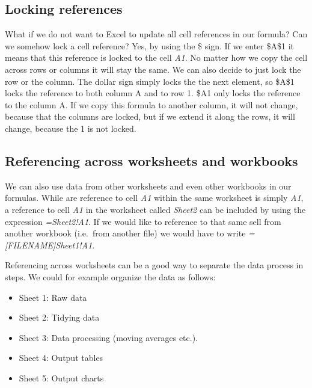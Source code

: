 \documentclass[]{book}
\providecommand{\tightlist}{%
  \setlength{\itemsep}{0pt}\setlength{\parskip}{0pt}}
\begin{document}
\hypertarget{locking-references}{%
\subsection{Locking references}\label{locking-references}}

What if we do not want to Excel to update all cell references in our formula? Can we somehow lock a cell reference? Yes, by using the \$ sign. If we enter \$A\$1 it means that this reference is locked to the cell \emph{A1}. No matter how we copy the cell across rows or columns it will stay the same. We can also decide to just lock the row or the column. The dollar sign simply locks the the next element, so \$A\$1 locks the reference to both column A and to row 1. \$A1 only locks the reference to the column A. If we copy this formula to another column, it will not change, because that the columns are locked, but if we extend it along the rows, it will change, because the 1 is not locked.

\hypertarget{referencing-across-worksheets-and-workbooks}{%
\subsection{Referencing across worksheets and workbooks}\label{referencing-across-worksheets-and-workbooks}}

We can also use data from other worksheets and even other workbooks in our formulas. While are reference to cell \emph{A1} within the same worksheet is simply \emph{A1}, a reference to cell \emph{A1} in the worksheet called \emph{Sheet2} can be included by using the expression \emph{=Sheet2!A1}. If we would like to reference to that same sell from another workbook (i.e.~from another file) we would have to write \emph{={[}FILENAME{]}Sheet1!A1}.

Referencing across worksheets can be a good way to separate the data process in steps. We could for example organize the data as follows:

\begin{itemize}
\tightlist
\item
  Sheet 1: Raw data
\item
  Sheet 2: Tidying data
\item
  Sheet 3: Data processing (moving averages etc.).
\item
  Sheet 4: Output tables
\item
  Sheet 5: Output charts
\end{itemize}
\end{document}
